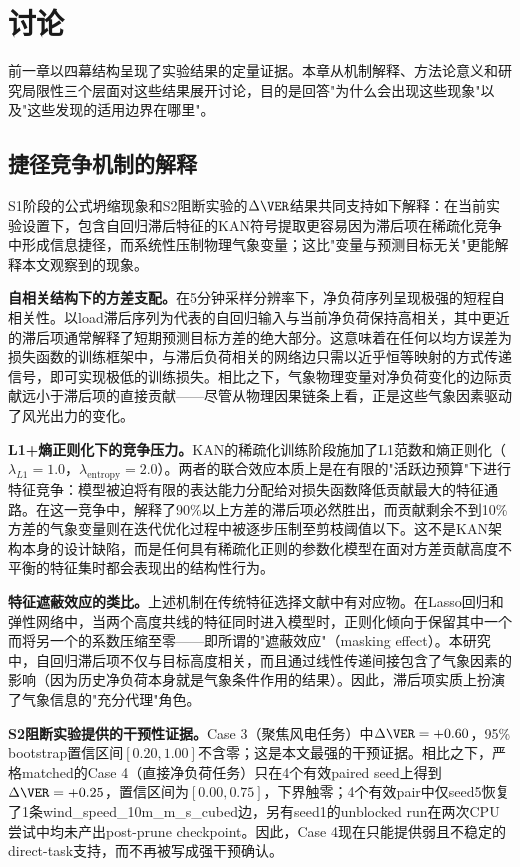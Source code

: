 \chapter{讨论}

前一章以四幕结构呈现了实验结果的定量证据。本章从机制解释、方法论意义和研究局限性三个层面对这些结果展开讨论，目的是回答"为什么会出现这些现象"以及"这些发现的适用边界在哪里"。

\section{捷径竞争机制的解释}

S1阶段的公式坍缩现象和S2阻断实验的$\Delta\VER$结果共同支持如下解释：在当前实验设置下，包含自回归滞后特征的KAN符号提取更容易因为滞后项在稀疏化竞争中形成信息捷径，而系统性压制物理气象变量；这比"变量与预测目标无关"更能解释本文观察到的现象。

\textbf{自相关结构下的方差支配。}在5分钟采样分辨率下，净负荷序列呈现极强的短程自相关性。以load滞后序列为代表的自回归输入与当前净负荷保持高相关，其中更近的滞后项通常解释了短期预测目标方差的绝大部分。这意味着在任何以均方误差为损失函数的训练框架中，与滞后负荷相关的网络边只需以近乎恒等映射的方式传递信号，即可实现极低的训练损失。相比之下，气象物理变量对净负荷变化的边际贡献远小于滞后项的直接贡献——尽管从物理因果链条上看，正是这些气象因素驱动了风光出力的变化。

\textbf{L1+熵正则化下的竞争压力。}KAN的稀疏化训练阶段施加了L1范数和熵正则化（$\lambda_{L1}=1.0$，$\lambda_{\text{entropy}}=2.0$）。两者的联合效应本质上是在有限的"活跃边预算"下进行特征竞争：模型被迫将有限的表达能力分配给对损失函数降低贡献最大的特征通路。在这一竞争中，解释了90\%以上方差的滞后项必然胜出，而贡献剩余不到10\%方差的气象变量则在迭代优化过程中被逐步压制至剪枝阈值以下。这不是KAN架构本身的设计缺陷，而是任何具有稀疏化正则的参数化模型在面对方差贡献高度不平衡的特征集时都会表现出的结构性行为。

\textbf{特征遮蔽效应的类比。}上述机制在传统特征选择文献中有对应物。在Lasso回归和弹性网络中，当两个高度共线的特征同时进入模型时，正则化倾向于保留其中一个而将另一个的系数压缩至零——即所谓的"遮蔽效应"（masking effect）。本研究中，自回归滞后项不仅与目标高度相关，而且通过线性传递间接包含了气象因素的影响（因为历史净负荷本身就是气象条件作用的结果）。因此，滞后项实质上扮演了气象信息的"充分代理"角色。

\textbf{S2阻断实验提供的干预性证据。}Case 3（聚焦风电任务）中$\Delta\VER=+0.60$，95\% bootstrap置信区间$[0.20, 1.00]$不含零；这是本文最强的干预证据。相比之下，严格matched的Case 4（直接净负荷任务）只在4个有效paired seed上得到$\Delta\VER=+0.25$，置信区间为$[0.00, 0.75]$，下界触零；4个有效pair中仅seed5恢复了1条wind\_speed\_10m\_m\_s\_cubed边，另有seed1的unblocked run在两次CPU尝试中均未产出post-prune checkpoint。因此，Case 4现在只能提供弱且不稳定的direct-task支持，而不再被写成强干预确认。

